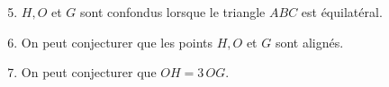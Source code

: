    \begin{enumerate}
   \setcounter{enumi}{4}
      \item $H, O$ et $G$ sont confondus lorsque {\blue le triangle $ABC$ est équilatéral}.
      \item On peut conjecturer que {\blue les points $H, O$ et $G$ sont alignés}.
      \item On peut conjecturer que {\blue $OH =3\,OG$}.
   \end{enumerate}
